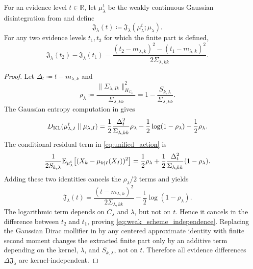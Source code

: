 \begin{lemma}
\label{lem:weak_scheme_independence}
For an evidence level $t\in\mathbb{R}$, let $\mu_\lambda^t$ be the weakly continuous
Gaussian disintegration from  and define
\[
\mathfrak{J}_\lambda(t)\coloneqq
\mathfrak{J}_\lambda(\mu_\lambda^t;\mu_\lambda).
\]
For any two evidence levels $t_1,t_2$ for which the finite part is defined,
\begin{equation}
    \mathfrak{J}_\lambda(t_2)-\mathfrak{J}_\lambda(t_1)
    =
    \frac{(t_2-m_{\lambda,k})^2-(t_1-m_{\lambda,k})^2}
    {2\Sigma_{\lambda,kk}}.
\end{equation}
\begin{proof}
Let $\Delta_t\coloneqq t-m_{\lambda,k}$ and
\[
    \rho_\lambda
    \coloneqq
    \frac{\|\Sigma_{\lambda,Ik}\|_{H_{C_\lambda}}^2}{\Sigma_{\lambda,kk}}
    =
    1-\frac{S_{k,\lambda}}{\Sigma_{\lambda,kk}}.
\]
The Gaussian entropy computation in  gives
\[
    D_{\operatorname{KL}}(\mu_{\lambda,I}^t\parallel\mu_{\lambda,I})
    =
    \frac{1}{2}\frac{\Delta_t^2}{\Sigma_{\lambda,kk}}\rho_\lambda
    -\frac{1}{2}\log(1-\rho_\lambda)-\frac{1}{2}\rho_\lambda .
\]
The conditional-residual term in \eqref{eq:unified_action} is
\[
    \frac{1}{2S_{k,\lambda}}
    \mathbb{E}_{\mu_\lambda^t}\!\left[
    (X_k-\mu_{k|I}(X_I))^2
    \right]
    =
    \frac{1}{2}\rho_\lambda
    +
    \frac{1}{2}\frac{\Delta_t^2}{\Sigma_{\lambda,kk}}(1-\rho_\lambda).
\]
Adding these two identities cancels the $\rho_\lambda/2$ terms and yields
\[
    \mathfrak{J}_\lambda(t)
    =
    \frac{(t-m_{\lambda,k})^2}{2\Sigma_{\lambda,kk}}
    -\frac{1}{2}\log(1-\rho_\lambda).
\]
The logarithmic term depends on $C_\lambda$ and $\lambda$, but not on $t$. Hence it
 cancels in the difference between $t_2$ and $t_1$, proving
 \eqref{eq:weak_scheme_independence}. Replacing the Gaussian Dirac mollifier in
  by any centered approximate identity with finite
 second moment changes the extracted finite part only by an additive term depending on
 the kernel, $\lambda$, and $S_{k,\lambda}$, not on $t$. Therefore all evidence
 differences $\Delta\mathfrak{J}_\lambda$ are kernel-independent.
\end{proof}
\end{lemma}

